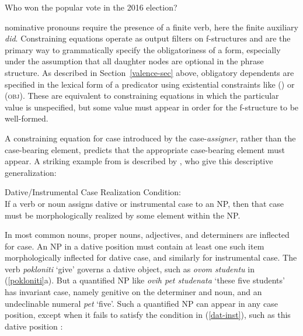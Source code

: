 \begin{exe}
\ex  Who won the popular vote in the 2016 election? 
\label{she}
\begin{xlist}
\end{xlist}
\end{exe}
 nominative pronouns require the presence of a finite verb, here the finite auxiliary \textit{did}.  Constraining equations operate as output filters on f-structures and are the primary way to grammatically specify the obligatoriness of a form, especially under the assumption that all daughter nodes are optional in the phrase structure.  As described in Section~\ref{valence-sec} above, obligatory dependents are specified in the lexical form of a predicator using existential constraints like (\up \subj) or (\up \textsc{obj}).  These are equivalent to constraining equations in which the particular value is unspecified, but some value must appear in order for the f-structure to be well-formed.  

A constraining equation for case  introduced by the case-\textit{assigner}, rather than the case-bearing element, predicts that the appropriate case-bearing element must appear.  A striking example from  is described by \citet[134]{WZ2003a}, who give this descriptive generalization:

\ea
{\label{dat-inst}
 Dative/Instrumental Case Realization Condition:\\
If a verb or noun assigns dative or instrumental case to an NP, then that case must be morphologically realized by some element within the NP.}
\z

\noindent
In  most common nouns, proper nouns, adjectives, and determiners are inflected for case.  An NP in a dative position must contain at least one such item morphologically inflected for dative case, and similarly for instrumental case.  The verb {\it pokloniti} `give' governs a dative object, such as \textit{ovom  studentu} in (\ref{pokloniti}a).  But a quantified NP like \textit{ovih pet studenata} `these five students' has invariant case, namely genitive on the determiner and noun, and an undeclinable numeral \textit{pet} `five'.  Such a quantified NP can appear in any case position, except when it fails to satisfy the condition in (\ref{dat-inst}), such as this dative position \citep[125]{WZ2003a}:

\begin{exe} 
\ex	\label{pokloniti} 
\begin{xlist}
\end{xlist}
\end{exe}

